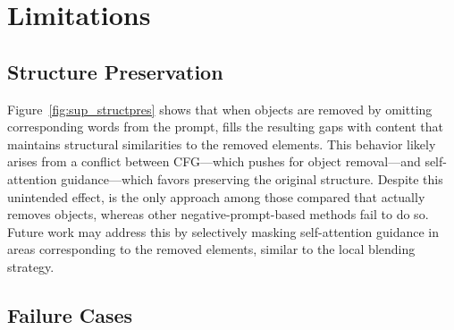 
\section{Limitations}
\subsection{Structure Preservation}
\label{sec:sup_limitations_structure}


    Figure~\ref{fig:sup_structpres} shows that when objects are removed by omitting corresponding words from the prompt, \method{} fills the resulting gaps with content that maintains structural similarities to the removed elements. This behavior likely arises from a conflict between CFG—which pushes for object removal—and self-attention guidance—which favors preserving the original structure. Despite this unintended effect, \method{} is the only approach among those compared that actually removes objects, whereas other negative-prompt-based methods fail to do so. Future work may address this by selectively masking self-attention guidance in areas corresponding to the removed elements, similar to the local blending strategy.



\subsection{Failure Cases}
\label{sec:sup_limitations_failure}




